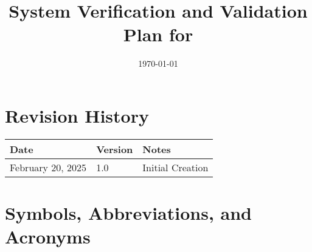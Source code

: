 \documentclass[12pt, titlepage]{article}
\begin{document}
\title{System Verification and Validation Plan for \progname{}} 
\author{\authname}
\date{\today}
	
\maketitle


\section*{Revision History}

\begin{tabularx}{\textwidth}{p{4cm}p{2cm}X}
\toprule {\bf Date} & {\bf Version} & {\bf Notes}\\
\midrule
February 20, 2025 & 1.0 & Initial Creation\\
\bottomrule
\end{tabularx}



\newpage

\tableofcontents

\listoftables
{}

\listoffigures
{}

\newpage

\section{Symbols, Abbreviations, and Acronyms}
\end{document}
